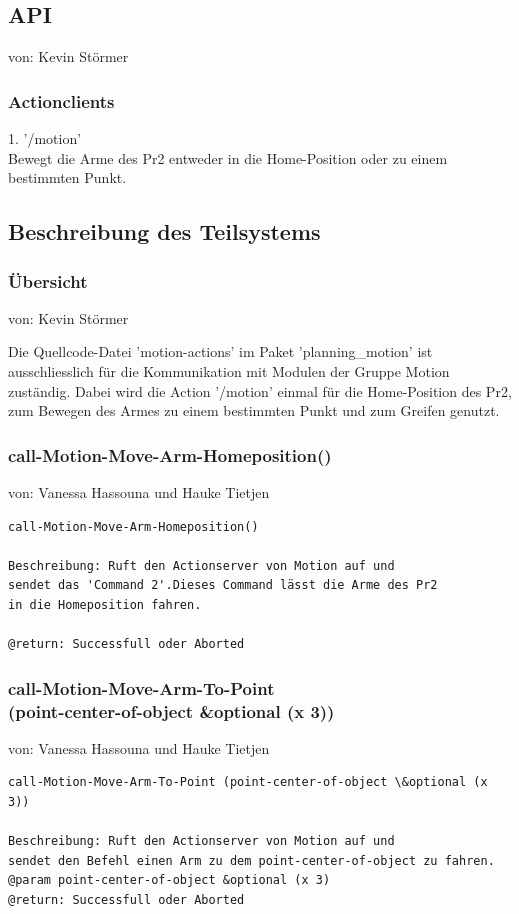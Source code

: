 \documentclass{suturo}
\makeatletter
\newcommand{\chapterauthor}[1]{%
  {\parindent0pt\vspace*{-27pt}%
  \linespread{0}\small\begin{flushright}von: #1\end{flushright}%
  \par\nobreak\vspace*{0pt}}
  \@afterheading%
}
\makeatother
\begin{document}
\subsection{API}
\chapterauthor{Kevin Störmer}
\subsubsection{Actionclients}
1. '/motion' \\
Bewegt die Arme des Pr2 entweder in die Home-Position oder zu einem bestimmten Punkt.
\subsection{Beschreibung des Teilsystems}
\subsubsection{\"Ubersicht}
\chapterauthor{Kevin Störmer}
Die Quellcode-Datei 'motion-actions' im Paket 'planning\_motion'  ist ausschliesslich für die Kommunikation mit Modulen der Gruppe Motion zuständig. Dabei wird die Action '/motion' einmal für die Home-Position des Pr2, zum Bewegen des Armes zu einem bestimmten Punkt und zum Greifen genutzt.


\subsubsection{call-Motion-Move-Arm-Homeposition()}
\chapterauthor{Vanessa Hassouna und Hauke Tietjen}
\begin{verbatim}
call-Motion-Move-Arm-Homeposition()

Beschreibung: Ruft den Actionserver von Motion auf und
sendet das 'Command 2'.Dieses Command lässt die Arme des Pr2 
in die Homeposition fahren.

@return: Successfull oder Aborted
\end{verbatim}



\subsubsection{call-Motion-Move-Arm-To-Point \\
(point-center-of-object \&optional (x 3))
}
\chapterauthor{Vanessa Hassouna und Hauke Tietjen}
\begin{verbatim}
call-Motion-Move-Arm-To-Point (point-center-of-object \&optional (x 3))

Beschreibung: Ruft den Actionserver von Motion auf und 
sendet den Befehl einen Arm zu dem point-center-of-object zu fahren.
@param point-center-of-object &optional (x 3)
@return: Successfull oder Aborted
\end{verbatim}
\end{document}
